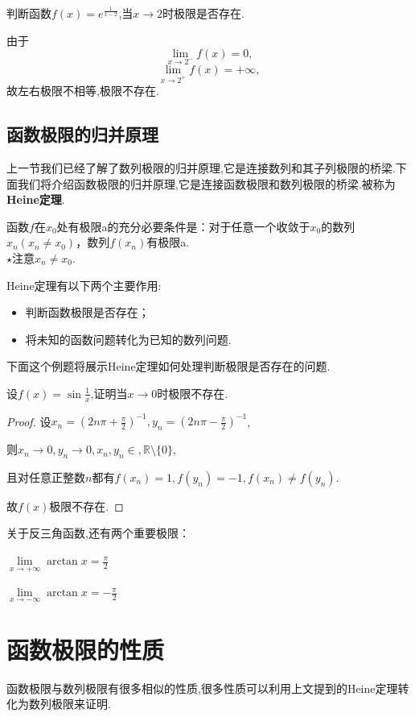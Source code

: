 	\begin{example}
		判断函数$f(x)=e^\frac{1}{x-2}$,当$x\to 2$时极限是否存在.
	\end{example}
	\begin{solution}
		由于\[
		\lim_{x\to 2^-}f(x)=0,
		\]\[
		\lim_{x\to 2^+}f(x)=+\infty,
		\]
		故左右极限不相等,极限不存在.
	\end{solution}
	
	
	\subsection{函数极限的归并原理}
	上一节我们已经了解了数列极限的归并原理,它是连接数列和其子列极限的桥梁.下面我们将介绍函数极限的归并原理,它是连接函数极限和数列极限的桥梁.被称为\textbf{Heine定理}.
	\begin{theorem}
		函数$f$在$x_0$处有极限a的充分必要条件是：对于任意一个收敛于$x_0$的数列${x_n}(x_n\neq x_0)$，数列${f(x_n)}$有极限a.\\
		$\star$注意$x_n\neq x_0$.
	\end{theorem}
	Heine定理有以下两个主要作用:
		\begin{itemize}
		\item 判断函数极限是否存在；
		\item 将未知的函数问题转化为已知的数列问题.
	\end{itemize}
	下面这个例题将展示Heine定理如何处理判断极限是否存在的问题.
	\begin{example}
		设$f(x)=\sin\frac{1}{x}$,证明当$x\to 0$时极限不存在.
	\end{example}
	\begin{proof}
		设$x_n=(2n\pi + \frac{\pi}{2})^{-1},y_n=(2n\pi - \frac{\pi}{2})^{-1}$,
		
		则$x_n\to 0,y_n\to 0,x_n,y_n\in ,\mathbb{R}\setminus \{0\}$,
		
		且对任意正整数$n$都有$f(x_n)=1,f(y_n)=-1,f(x_n)\ne f(y_n)$.
		
		故$f(x)$极限不存在.
	\end{proof}
	关于反三角函数,还有两个重要极限：
	\begin{example}
		$\lim\limits_{x\to +\infty} \arctan x=\frac{\pi}{2}$
		
		$\lim\limits_{x\to -\infty} \arctan x=-\frac{\pi}{2}$
	\end{example}
	
	\section{函数极限的性质}
	函数极限与数列极限有很多相似的性质,很多性质可以利用上文提到的Heine定理转化为数列极限来证明.
	
